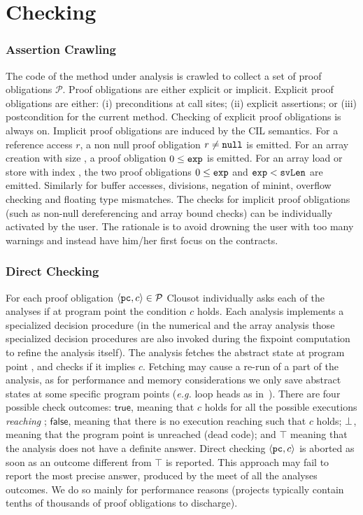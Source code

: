 \documentclass{llncs}
\begin{document}
\section{Checking}

\subsubsection{Assertion Crawling}
The code of the method under analysis is crawled to collect a set of
proof obligations $\mathcal{P}$.  Proof obligations are either
explicit or implicit.  Explicit proof obligations are either: (i)
preconditions at call sites; (ii) explicit assertions; or (iii)
postcondition for the current method.  Checking of explicit proof
obligations is always on.  Implicit proof obligations are induced by
the CIL semantics.  For a reference access $r$, a non null proof
obligation $r \neq \mathtt{null}$ is emitted.  For an array creation
with size , a proof obligation $0 \leq \mathtt{exp}$ is
emitted.  For an array load or store with index , the two
proof obligations $0 \leq \mathtt{exp}$ and $\mathtt{exp} < \mathtt{svLen}$
are emitted.  Similarly for buffer accesses, divisions, negation of
minint, overflow checking and floating type mismatches.  The checks for
implicit proof obligations (such as non-null dereferencing and array
bound checks) can be individually activated by the user.
The rationale is to avoid drowning the user
with too many warnings and instead have him/her first focus on the contracts.

\subsubsection{Direct Checking}
For each proof obligation $\langle \mathtt{pc}, c \rangle \in \mathcal{P}$
Clousot individually asks each of the analyses if at program point
 the condition $c$ holds.  Each analysis implements a
specialized decision procedure (in the numerical and the array
analysis those specialized decision procedures are also invoked during
the fixpoint computation to refine the analysis itself).  The analysis
fetches the abstract state at program point , and checks if
it implies $c$.  Fetching may cause a re-run of a part of the
analysis, as for performance and memory considerations we only save
abstract states at some specific program points (\emph{e.g.} loop
heads as in~\cite{astree}).  There are four possible check outcomes:
$\mathsf{true}$, meaning that $c$ holds for all the possible
executions \emph{reaching} ; $\mathsf{false}$, meaning that
there is no execution reaching  such that $c$ holds;
$\bot$, meaning that the program point  is unreached (dead
code); and $\top$ meaning that the analysis does not have a definite
answer.  Direct checking $\langle \mathtt{pc}, c \rangle$ is aborted as soon as
an outcome different from $\top$ is reported. This approach may fail to
report the most precise answer, produced by the meet of all the
analyses outcomes.  We do so mainly for performance reasons (projects
typically contain tenths of thousands of proof obligations to
discharge).
\end{document}
